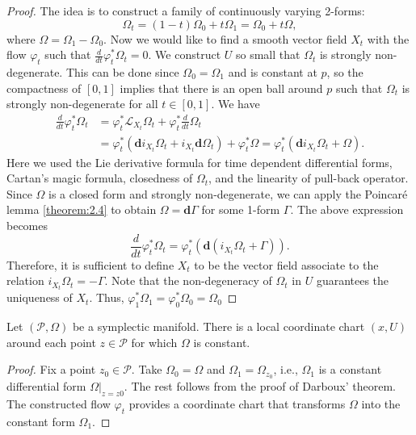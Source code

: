 \begin{proof}
The idea is to construct a family of continuously varying 2-forms:
\begin{equation*}
\Omega_t = (1-t)\Omega_0 + t\Omega_1 = \Omega_0 + t \Omega,
\end{equation*}
where $\Omega = \Omega_1 - \Omega_0$. Now we would like to find a smooth vector field $X_t$ with the flow $\varphi_t$ such that $\frac{d}{dt} \varphi_t^*\Omega_t = 0$. We construct $U$ so small that $\Omega_t$ is strongly non-degenerate. This can be done since $\Omega_0 = \Omega_1$ and is constant at $p$, so the compactness of $[0,1]$ implies that there is an open ball around $p$ such that $\Omega_t$ is strongly non-degenerate for all $t\in [0,1]$. We have
\begin{equation*}
\begin{aligned}
	\frac{d}{dt} \varphi_t^*\Omega_t &= \varphi_t^* \mathcal L_{X_t} \Omega_t + \varphi_t^* \frac{d}{dt} \Omega_t \\
	&= \varphi_t^*( \mathbf d i_{X_t}\Omega_t + i_{X_t} \mathbf d \Omega_t ) + \varphi_t^* \Omega
	= \varphi_t^*( \mathbf d i_{X_t}\Omega_t + \Omega ).
\end{aligned}
\end{equation*}
Here we used the Lie derivative formula for time dependent differential forms, Cartan's magic formula, closedness of $\Omega_t$, and the linearity of pull-back operator. Since $\Omega$ is a closed form and strongly non-degenerate, we can apply the Poincar\'e lemma \ref{theorem:2.4} to obtain $\Omega = \mathbf d \Gamma$ for some 1-form $\Gamma$. The above expression becomes
\begin{equation*}
	\frac{d}{dt} \varphi_t^*\Omega_t = \varphi_t^*( \mathbf d ( i_{X_t}\Omega_t + \Gamma ) ).
\end{equation*}
Therefore, it is sufficient to define $X_t$ to be the vector field associate to the relation $i_{X_t}\Omega_t = - \Gamma$. Note that the non-degeneracy of $\Omega_t$ in $U$ guarantees the uniqueness of $X_t$. Thus, $\varphi_1^* \Omega_1 = \varphi_0^* \Omega_0 = \Omega_0$
\end{proof}

\begin{corollary} \label{theorem:2.6}
Let $(\mathcal P, \Omega)$ be a symplectic manifold. There is a local coordinate chart $(x,U)$ around each point $z\in\mathcal P$ for which $\Omega$ is constant.
\end{corollary}
\begin{proof}
Fix a point $z_0 \in \mathcal P$. Take $\Omega_0 = \Omega$ and $\Omega_1 = \Omega_{z_0}$, i.e., $\Omega_1$ is a constant differential form $\Omega|_{z = z0}$. The rest follows from the proof of Darboux' theorem. The constructed flow $\varphi_t$ provides a coordinate chart that transforms $\Omega$ into the constant form $\Omega_1$.
\end{proof}

